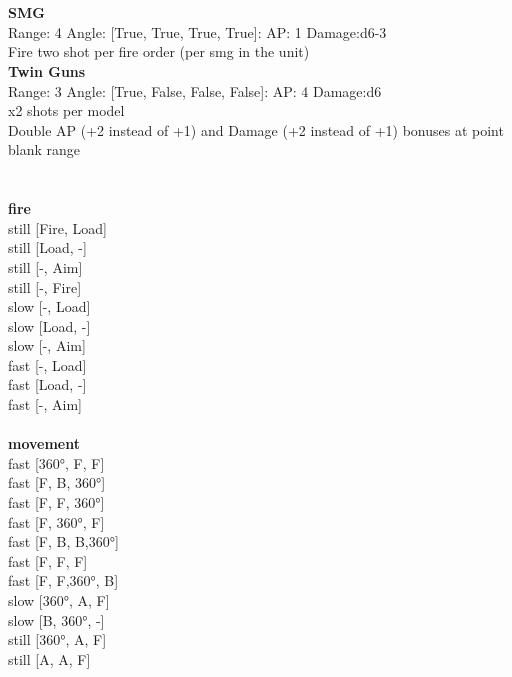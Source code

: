\ \\

\ \\
{\bf SMG } \\



Range: 4  Angle: [True, True, True, True]: AP: 1 Damage:d6-3 \\
Fire two shot per fire order (per smg in the unit)\\ 




{\bf Twin Guns } \\



Range: 3  Angle: [True, False, False, False]: AP: 4 Damage:d6 \\
x2 shots per model\\ 
Double AP (+2 instead of +1) and Damage (+2 instead of +1) bonuses at point blank range\\ 




 
\ \\



\ \\ {\bf fire } \\
still [Fire, Load] \\
still [Load, -] \\
still [-, Aim] \\
still [-, Fire] \\
slow [-, Load] \\
slow [Load, -] \\
slow [-, Aim] \\
fast [-, Load] \\
fast [Load, -] \\
fast [-, Aim] \\
\ \\ {\bf movement } \\
fast [360°, F, F] \\
fast [F, B, 360°] \\
fast [F, F, 360°] \\
fast [F, 360°, F] \\
fast [F, B, B,360°] \\
fast [F, F, F] \\
fast [F, F,360°, B] \\
slow [360°, A, F] \\
slow [B, 360°, -] \\
still [360°, A, F] \\
still [A, A, F] \\


